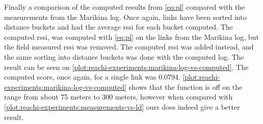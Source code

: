 Finally a comparison of the computed results from \autoref{eq:pl} compared with the measurements from the Marikina log. Once again, links have been sorted into distance buckets and had the average \gls{rssi} for each bucket computed. The computed \gls{rssi}, was computed with \autoref{eq:pl} on the links from the Marikina log, but the field measured \gls{rssi} was removed. The computed \gls{rssi} was added instead, and the same sorting into distance buckets was done with the computed log. The result can be seen on \autoref{plot:reachi-experiments:marikina-log-vs-computed}. The computed score, once again, for a single link was 0.0794. \autoref{plot:reachi-experiments:marikina-log-vs-computed} shows that the function is off on the range from about 75 meters to 300 meters, however when compared with \autoref{plot:reachi-experiments:measurements-vs-ld} ours does indeed give a better result.